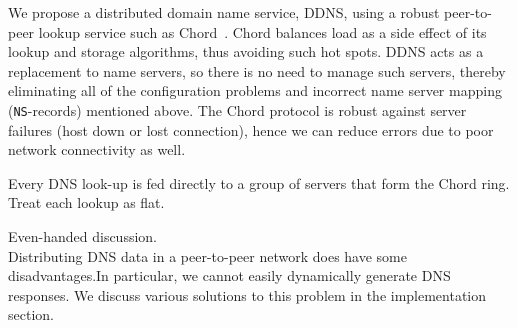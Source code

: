 
We propose a distributed domain name service, DDNS,
using a robust peer-to-peer lookup service such as Chord~\cite{chord:sigcomm}.
Chord balances load as a side effect of its lookup and storage 
algorithms, thus avoiding such hot spots.
DDNS acts as a replacement to name servers, so there is no need 
to manage such servers, thereby eliminating all of 
the configuration problems and incorrect name server mapping 
({\tt NS}-records) mentioned above. 
The Chord protocol is robust against server failures 
(host down or lost connection),
hence we can reduce errors due to poor network connectivity as well.

Every DNS look-up is fed directly to a group of servers that form
the Chord ring. Treat each lookup as flat.
 
Even-handed discussion.\\
Distributing DNS data in a peer-to-peer network does have some
disadvantages.In particular, we cannot easily dynamically 
generate DNS responses. We discuss various solutions to 
this problem in the implementation section.



